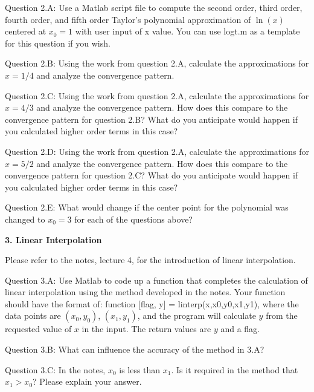 \documentclass{article}
\def\ds{\displaystyle}
\begin{document}
\par \medskip \noindent
%
Question 2.A: Use a Matlab script file to compute the second order, third order, fourth order, and fifth order Taylor's polynomial approximation of $\ds \ln(x)$ centered at $\ds x_0=1$ with user input of x value. You can use logt.m as a template for this question if you wish. \medskip \par \noindent
%
Question 2.B: Using the work from question 2.A, calculate the approximations for $x=1/4$ and analyze the convergence pattern.  \medskip \par \noindent
%
Question 2.C:  Using the work from question 2.A, calculate the approximations for $x=4/3$ and analyze the convergence pattern. How does this compare to the convergence pattern for question 2.B? What do you anticipate would happen if you calculated higher order terms in this case?  
\medskip \par \noindent
%
Question 2.D: Using the work from question 2.A, calculate the approximations for $x=5/2$ and analyze the convergence pattern. How does this compare to the convergence pattern for question 2.C? What do you anticipate would happen if you calculated higher order terms in this case?  \medskip \par \noindent
%
Question 2.E: What would change if the center point for the polynomial was changed to $x_0=3$ for each of the questions above? 
\par \bigskip \par
{\bf 3. Linear Interpolation} \\  \par \medskip \noindent
Please refer to the notes, lecture 4, for the introduction of linear interpolation. 
\par \medskip \noindent
%
Question 3.A: Use Matlab to code up a function that completes the calculation of linear interpolation using the method developed in the notes. Your function should have the format of: function [flag, y] = linterp(x,x0,y0,x1,y1), where the data points are $\ds (x_0, y_0)$, $\ds (x_1, y_1)$, and the program will calculate $y$ from the requested value of $x$ in the input. The return values are $y$ and a flag. 
\medskip \par \noindent
%
Question 3.B: What can influence the accuracy of the method in 3.A?
  \medskip \par \noindent
%
Question 3.C: In the notes, $\ds x_0$ is less than $\ds x_1$. Is it required in the method that $\ds x_1 > x_0$? Please explain your answer.  
\end{document}
